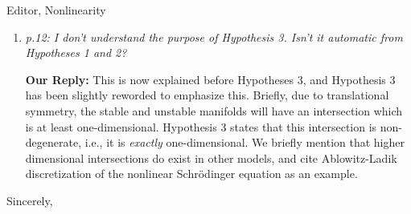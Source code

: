 \documentclass[11pt]{letter}
\begin{document}
\begin{letter}{Editor, Nonlinearity}
\begin{enumerate}
 {\bf Our Reply:}     Lin's method constructs multi-breathers as a sequence of well-separated copies of the primary breather, to leading order. There will be a remainder term, but this will be small. This has been clarified in the revised manuscript. We have added a paragraph on page 2, as well as schematics in Figure 1, as a high-level explanation of Lin's method. This is also clarified in the first paragraph of Section 4.2. We also added a few sentences on page 4 regarding the application Lin's method to the construction of eigenfunctions.
    \vspace{4mm}

    \item \emph{p.12: I don’t understand the purpose of Hypothesis 3. Isn’t it automatic from Hypotheses 1 and 2?}
 
  {\bf Our Reply:}    This is now explained before Hypotheses 3, and Hypothesis 3 has been slightly reworded to emphasize this. Briefly, due to translational symmetry, the stable and unstable manifolds will have an intersection which is at least one-dimensional. Hypothesis 3 states that this intersection is non-degenerate, i.e., it is \emph{exactly} one-dimensional. We briefly mention that higher dimensional intersections do exist in other models, and cite Ablowitz-Ladik discretization of the nonlinear Schr{\"o}dinger equation as an example.
\end{enumerate}


\closing{Sincerely,}

\end{letter}
\end{document}
